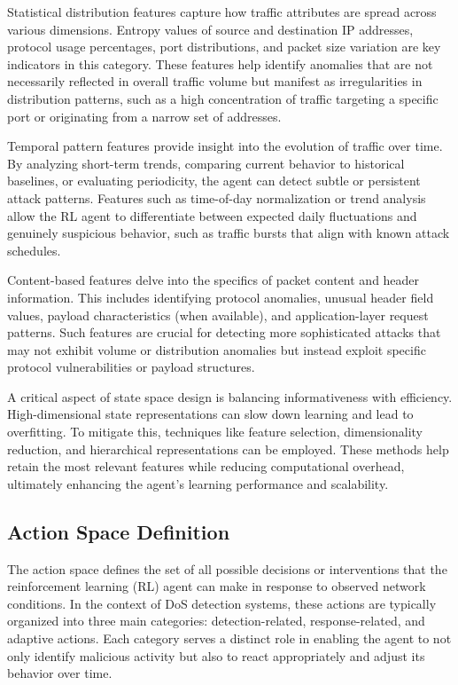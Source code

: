 \documentclass{report}
\begin{document}
Statistical distribution features capture how traffic attributes are spread across various dimensions. Entropy values of source and destination IP addresses, protocol usage percentages, port distributions, and packet size variation are key indicators in this category. These features help identify anomalies that are not necessarily reflected in overall traffic volume but manifest as irregularities in distribution patterns, such as a high concentration of traffic targeting a specific port or originating from a narrow set of addresses.

Temporal pattern features provide insight into the evolution of traffic over time. By analyzing short-term trends, comparing current behavior to historical baselines, or evaluating periodicity, the agent can detect subtle or persistent attack patterns. Features such as time-of-day normalization or trend analysis allow the RL agent to differentiate between expected daily fluctuations and genuinely suspicious behavior, such as traffic bursts that align with known attack schedules.

Content-based features delve into the specifics of packet content and header information. This includes identifying protocol anomalies, unusual header field values, payload characteristics (when available), and application-layer request patterns. Such features are crucial for detecting more sophisticated attacks that may not exhibit volume or distribution anomalies but instead exploit specific protocol vulnerabilities or payload structures.

A critical aspect of state space design is balancing informativeness with efficiency. High-dimensional state representations can slow down learning and lead to overfitting. To mitigate this, techniques like feature selection, dimensionality reduction, and hierarchical representations can be employed. These methods help retain the most relevant features while reducing computational overhead, ultimately enhancing the agent’s learning performance and scalability.

\subsection{Action Space Definition}

The action space defines the set of all possible decisions or interventions that the reinforcement learning (RL) agent can make in response to observed network conditions. In the context of DoS detection systems, these actions are typically organized into three main categories: detection-related, response-related, and adaptive actions. Each category serves a distinct role in enabling the agent to not only identify malicious activity but also to react appropriately and adjust its behavior over time.
\end{document}
